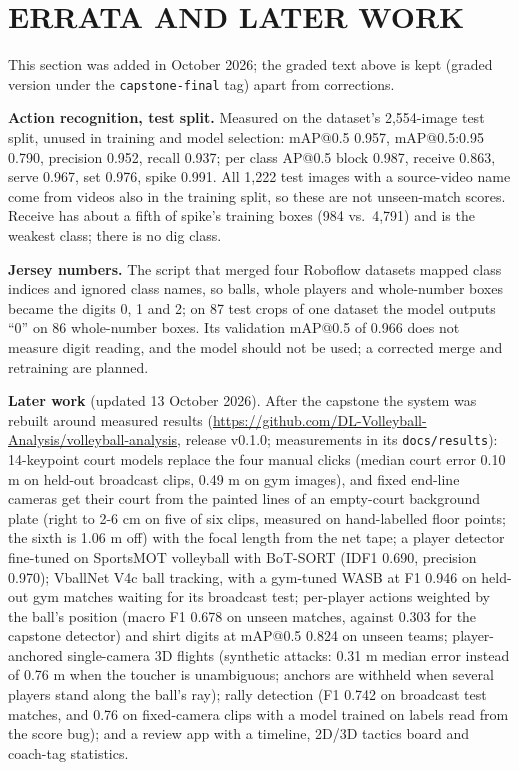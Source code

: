 \documentclass[journal]{IEEEtran}
\begin{document}
\section{ERRATA AND LATER WORK}
This section was added in October 2026; the graded text above is kept (graded version under the \texttt{capstone-final} tag) apart from corrections.

\textbf{Action recognition, test split.} Measured on the dataset's 2,554-image test split, unused in training and model selection: mAP@0.5 0.957, mAP@0.5:0.95 0.790, precision 0.952, recall 0.937; per class AP@0.5 block 0.987, receive 0.863, serve 0.967, set 0.976, spike 0.991. All 1,222 test images with a source-video name come from videos also in the training split, so these are not unseen-match scores. Receive has about a fifth of spike's training boxes (984 vs.\ 4,791) and is the weakest class; there is no dig class.

\textbf{Jersey numbers.} The script that merged four Roboflow datasets mapped class indices and ignored class names, so balls, whole players and whole-number boxes became the digits 0, 1 and 2; on 87 test crops of one dataset the model outputs ``0'' on 86 whole-number boxes. Its validation mAP@0.5 of 0.966 does not measure digit reading, and the model should not be used; a corrected merge and retraining are planned.

\textbf{Later work} (updated 13 October 2026). After the capstone the system was rebuilt around measured results (\url{https://github.com/DL-Volleyball-Analysis/volleyball-analysis}, release v0.1.0; measurements in its \texttt{docs/results}): 14-keypoint court models replace the four manual clicks (median court error 0.10 m on held-out broadcast clips, 0.49 m on gym images), and fixed end-line cameras get their court from the painted lines of an empty-court background plate (right to 2-6 cm on five of six clips, measured on hand-labelled floor points; the sixth is 1.06 m off) with the focal length from the net tape; a player detector fine-tuned on SportsMOT volleyball with BoT-SORT (IDF1 0.690, precision 0.970); VballNet V4c ball tracking, with a gym-tuned WASB at F1 0.946 on held-out gym matches waiting for its broadcast test; per-player actions weighted by the ball's position (macro F1 0.678 on unseen matches, against 0.303 for the capstone detector) and shirt digits at mAP@0.5 0.824 on unseen teams; player-anchored single-camera 3D flights (synthetic attacks: 0.31 m median error instead of 0.76 m when the toucher is unambiguous; anchors are withheld when several players stand along the ball's ray); rally detection (F1 0.742 on broadcast test matches, and 0.76 on fixed-camera clips with a model trained on labels read from the score bug); and a review app with a timeline, 2D/3D tactics board and coach-tag statistics.
\end{document}
